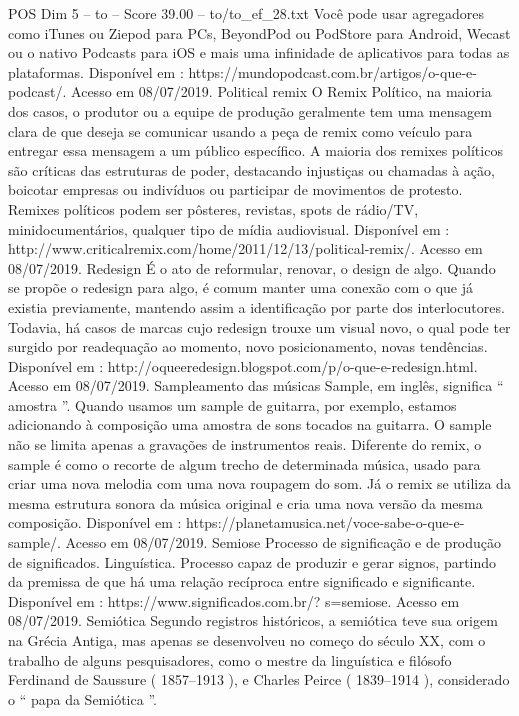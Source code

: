 \begin{textsample}{POS Dim 5 – to – Score 39.00 – to/to\_ef\_28.txt}
Você pode usar agregadores como iTunes ou Ziepod para PCs, BeyondPod ou PodStore para Android, Wecast ou o nativo Podcasts para iOS e mais uma infinidade de aplicativos para todas as plataformas.
Disponível em : https://mundopodcast.com.br/artigos/o-que-e-podcast/.
Acesso em 08/07/2019.
Political remix O Remix Político, na maioria dos casos, o produtor ou a equipe de produção geralmente tem uma mensagem clara de que deseja se comunicar usando a peça de remix como veículo para entregar essa mensagem a um público específico.
A maioria dos remixes políticos são críticas das estruturas de poder, destacando injustiças ou chamadas à ação, boicotar empresas ou indivíduos ou participar de movimentos de protesto.
Remixes políticos podem ser pôsteres, revistas, spots de rádio/TV, minidocumentários, qualquer tipo de mídia audiovisual.
Disponível em : http://www.criticalremix.com/home/2011/12/13/political-remix/.
Acesso em 08/07/2019.
Redesign É o ato de reformular, renovar, o design de algo.
Quando se propõe o redesign para algo, é comum manter uma conexão com o que já existia previamente, mantendo assim a identificação por parte dos interlocutores.
Todavia, há casos de marcas cujo redesign trouxe um visual novo, o qual pode ter surgido por readequação ao momento, novo posicionamento, novas tendências.
Disponível em : http://oqueeredesign.blogspot.com/p/o-que-e-redesign.html.
Acesso em 08/07/2019.
Sampleamento das músicas Sample, em inglês, significa “ amostra ”.
Quando usamos um sample de guitarra, por exemplo, estamos adicionando à composição uma amostra de sons tocados na guitarra.
O sample não se limita apenas a gravações de instrumentos reais.
Diferente do remix, o sample é como o recorte de algum trecho de determinada música, usado para criar uma nova melodia com uma nova roupagem do som.
Já o remix se utiliza da mesma estrutura sonora da música original e cria uma nova versão da mesma composição.
Disponível em : https://planetamusica.net/voce-sabe-o-que-e-sample/.
Acesso em 08/07/2019.
Semiose Processo de significação e de produção de significados.
Linguística.
Processo capaz de produzir e gerar signos, partindo da premissa de que há uma relação recíproca entre significado e significante.
Disponível em : https://www.significados.com.br/? s=semiose.
Acesso em 08/07/2019.
Semiótica Segundo registros históricos, a semiótica teve sua origem na Grécia Antiga, mas apenas se desenvolveu no começo do século XX, com o trabalho de alguns pesquisadores, como o mestre da linguística e filósofo Ferdinand de Saussure ( 1857–1913 ), e Charles Peirce ( 1839–1914 ), considerado o “ papa da Semiótica ”.

\end{textsample}
